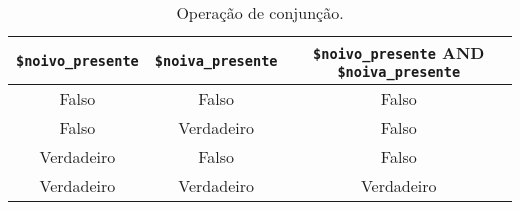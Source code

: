 \begin{table}[h]
\caption{Operação de conjunção.}\label{tab:cap4-operacao-de-conjuncao}
\begin{center}
\begin{tabular}{|c|c|c|}
\hline
  \multicolumn{1}{|c|}{ \textbf{\texttt{\$noivo\_presente}}}
&  \multicolumn{1}{|c|}{ \textbf{\texttt{\$noiva\_presente}}}
&  \multicolumn{1}{|c|}{ \textbf{\texttt{\$noivo\_presente} AND \texttt{\$noiva\_presente}}} \\
\hline
\hline
Falso  & Falso & Falso\\ \hline
Falso  & Verdadeiro & Falso\\ \hline
Verdadeiro  & Falso & Falso\\ \hline
Verdadeiro  & Verdadeiro & Verdadeiro\\ \hline
\end{tabular}
\end{center}
\end{table}

